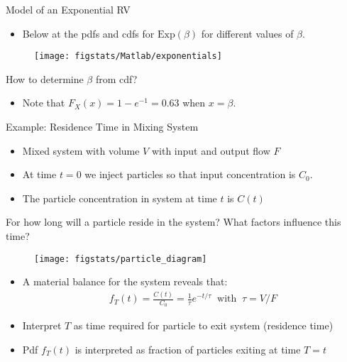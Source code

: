 \documentclass[9pt]{beamer}
\begin{document}
%
\begin{frame}{Model of an Exponential RV}
\begin{itemize}
\item Below at the pdfs and cdfs for $\textrm{Exp}(\beta)$ for different values of $\beta$.
\end{itemize}
\begin{figure}[!htb]
    \centering
	\texttt{[image: figstats/Matlab/exponentials]}
\end{figure}
\begin{block}{}
\begin{center}
How to determine $\beta$ from cdf? 
\end{center}
\end{block}
\pause
\begin{itemize}
\item Note that $F_X(x)=1-e^{-1}=0.63$ when $x=\beta$. 
\end{itemize}
\end{frame}

%
\begin{frame}{Example: Residence Time in Mixing System}
\begin{itemize}
\item  Mixed system with volume $V$ with input and output flow $F$
\item At time $t=0$ we inject particles so that input concentration is $C_0$.
\item The particle concentration in system at time $t$ is $C(t)$
\end{itemize}
\begin{block}{}
For how long will a particle reside in the system?  What factors influence this time? 
\end{block}
\begin{figure}[!htb]
    \centering
	\texttt{[image: figstats/particle\_diagram]}
\end{figure}
\pause
\begin{itemize}
\item A material balance for the system reveals that:
\begin{align}
f_T(t)=\frac{C(t)}{C_0}= \frac{1}{\tau}e^{-t/\tau}\;\; \textrm{with}\;\; \tau=V/F
\end{align}
\item Interpret $T$ as time required for particle to exit system (residence time)
\item Pdf $f_T(t)$ is interpreted as fraction of particles exiting at time $T=t$
\end{itemize}
\end{frame}
\end{document}
